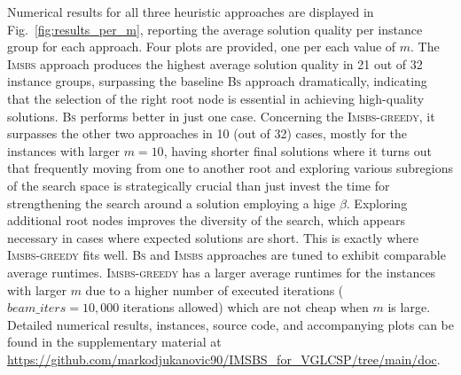 \documentclass[runningheads]{llncs}
\begin{document}
  
  Numerical results for all three heuristic approaches are displayed in Fig.~\ref{fig:results_per_m}, reporting the average solution quality per instance group for each approach. Four plots are provided, one per each value of $m$. %
   The \textsc{Imsbs} approach produces the highest average solution quality in 21 out of 32 instance groups, surpassing the baseline \textsc{Bs} approach dramatically, indicating that the selection of the right root node is essential in achieving high-quality solutions.   \textsc{Bs} performs better in just one case. Concerning the \textsc{Imsbs-greedy}, it surpasses the other two approaches in 10 (out of 32) cases, mostly for the instances with larger $m=10$, having shorter final solutions where it turns out that frequently moving from one to another root and exploring various subregions of the search space is strategically crucial than just invest the time for strengthening the search around a solution employing a hige $\beta$.  Exploring additional root nodes improves the diversity of the search, which appears necessary in cases where expected solutions are short. This is exactly where  \textsc{Imsbs-greedy} fits well. 
\textsc{Bs} and \textsc{Imsbs} approaches are tuned to exhibit comparable average runtimes.  \textsc{Imsbs-greedy} has a larger average runtimes for the instances with larger $m$ due to a higher number of executed iterations ($beam\_iters = 10,000$ iterations allowed) which are not cheap when $m$ is large. Detailed numerical results, instances, source code, and  accompanying plots can be found in the supplementary material at  \url{https://github.com/markodjukanovic90/IMSBS_for_VGLCSP/tree/main/doc}.  %
  	
  	
\end{document}

